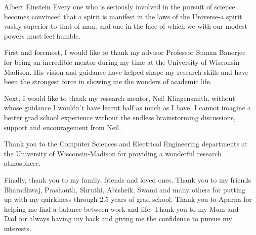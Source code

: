 \begin{wbepi}{Albert Einstein}
Every one who is seriously involved in the pursuit of science becomes convinced that a spirit is manifest in the laws of the Universe-a spirit vastly superior to that of man, and one in the face of which we with our modest powers must feel humble.
\end{wbepi}

First and foremost, I would like to thank my advisor Professor Suman Banerjee for being an incredible mentor during my time at the University of Wisconsin-Madison.
 His vision and guidance have helped shape my research skills and have been the strongest force in showing me the wonders of academic life.


Next, I would like to thank my research mentor, Neil Klingensmith, without whose guidance I wouldn't have learnt half as much as I have.
 I cannot imagine a better grad school experience without the endless brainstorming discussions, support and encouragement from Neil.


Thank you to the Computer Sciences and Electrical Engineering departments at the University of Wisconsin-Madison for providing a wonderful research atmosphere.


Finally, thank you to my family, friends and loved ones. Thank you to my friends Bharadhwaj, Prashanth, Shruthi, Abisheik, Swami and many others for putting up with my quirkiness through 2.5 years of grad school.
 Thank you to Aparna for helping me find a balance between work and life.
 Thank you to my Mom and Dad for always having my back and giving me the confidence to pursue my interests.
